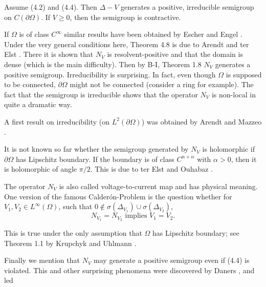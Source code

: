 \begin{theorem}[4.8]
Assume (4.2) and (4.4). Then $\Delta - V$ generates a positive, irreducible semigroup on $C(\partial\Omega)$. If $V \geq 0$, then the semigroup is contractive.
\end{theorem}

If $\Omega$ is of class $C^\infty$ similar results have been obtained by Escher \cite{Es94} and Engel \cite{En03}. Under the very general conditions here, Theorem 4.8 is due to Arendt and ter Elst \cite{AtE20}. There it is shown that $N_V$ is resolvent-positive and that the domain is dense (which is the main difficulty). Then by B-I, Theorem 1.8 $N_V$ generates a positive semigroup. Irreducibility is surprising. In fact, even though $\Omega$ is supposed to be connected, $\partial\Omega$ might not be connected (consider a ring for example). The fact that the semigroup is irreducible shows that the operator $N_V$ is non-local in quite a dramatic way.

A first result on irreducibility (on $L^2(\partial\Omega)$) was obtained by Arendt and Mazzeo \cite{AM12}.

It is not known so far whether the semigroup generated by $N_V$ is holomorphic if $\partial\Omega$ has Lipschitz boundary. If the boundary is of class $C^{n+\alpha}$ with $\alpha > 0$, then it is holomorphic of angle $\pi/2$. This is due to ter Elst and Ouhabaz \cite{tEO19}.

The operator $N_V$ is also called voltage-to-current map and has physical meaning. One version of the famous Calderón-Problem is the question whether for $V_1, V_2 \in L^\infty(\Omega)$, such that $0 \notin \sigma(\Delta_{V_1}) \cup \sigma(\Delta_{V_2})$,
\[N_{V_1} = N_{V_2} \text{ implies } V_1 = V_2.\]

This is true under the only assumption that $\Omega$ has Lipschitz boundary; see Theorem 1.1 by Krupchyk and Uhlmann \cite{KU14}.

Finally we mention that $N_V$ may generate a positive semigroup even if (4.4) is violated. This and other surprising phenomena were discovered by Daners \cite{Da14}, and led

